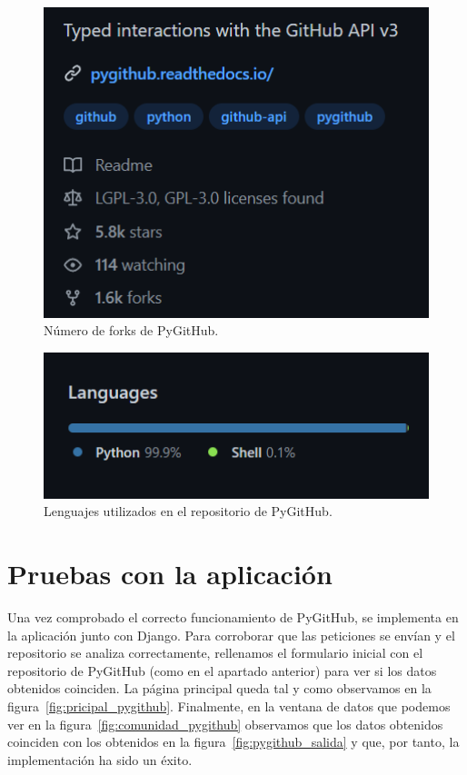 \documentclass[a4paper, 12pt]{book}
\begin{document}
\begin{figure}
    \centering
    \includegraphics[width=1\textwidth, keepaspectratio]{img/pygithub_forks.png}
    \caption{Número de forks de PyGitHub.}\label{fig:pygithub_forks}
\end{figure}

\begin{figure}
    \centering
    \includegraphics[width=1\textwidth, keepaspectratio]{img/pygithub_lenguajes.png}
    \caption{Lenguajes utilizados en el repositorio de PyGitHub.}\label{fig:pygithub_lenguajes}
\end{figure}

\section{Pruebas con la aplicación}

Una vez comprobado el correcto funcionamiento de PyGitHub, se implementa en la aplicación junto con Django. Para corroborar que las peticiones se envían y el repositorio se analiza correctamente, rellenamos el formulario inicial con el repositorio de PyGitHub (como en el apartado anterior) para ver si los datos obtenidos coinciden. La página principal queda tal y como observamos en la figura~\ref{fig:pricipal_pygithub}. Finalmente, en la ventana de datos que podemos ver en la figura~\ref{fig:comunidad_pygithub} observamos que los datos obtenidos coinciden con los obtenidos en la figura~\ref{fig:pygithub_salida} y que, por tanto, la implementación ha sido un éxito.
\end{document}
